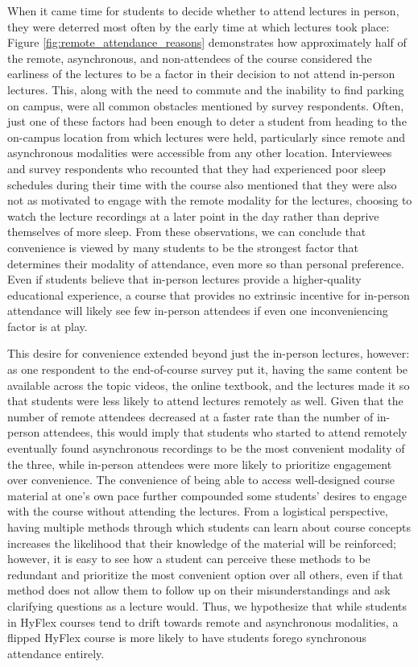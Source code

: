 When it came time for students to decide whether to attend lectures in person, they were deterred most often by the early time at which lectures took place: Figure \ref{fig:remote_attendance_reasons} demonstrates how approximately half of the remote, asynchronous, and non-attendees of the course considered the earliness of the lectures to be a factor in their decision to not attend in-person lectures. This, along with the need to commute and the inability to find parking on campus, were all common obstacles mentioned by survey respondents. Often, just one of these factors had been enough to deter a student from heading to the on-campus location from which lectures were held, particularly since remote and asynchronous modalities were accessible from any other location. Interviewees and survey respondents who recounted that they had experienced poor sleep schedules during their time with the course also mentioned that they were also not as motivated to engage with the remote modality for the lectures, choosing to watch the lecture recordings at a later point in the day rather than deprive themselves of more sleep. From these observations, we can conclude that convenience is viewed by many students to be the strongest factor that determines their modality of attendance, even more so than personal preference. Even if students believe that in-person lectures provide a higher-quality educational experience, a course that provides no extrinsic incentive for in-person attendance will likely see few in-person attendees if even one inconveniencing factor is at play.

This desire for convenience extended beyond just the in-person lectures, however: as one respondent to the end-of-course survey put it, having the same content be available across the topic videos, the online textbook, and the lectures made it so that students were less likely to attend lectures remotely as well. Given that the number of remote attendees decreased at a faster rate than the number of in-person attendees, this would imply that students who started to attend remotely eventually found asynchronous recordings to be the most convenient modality of the three, while in-person attendees were more likely to prioritize engagement over convenience. The convenience of being able to access well-designed course material at one's own pace further compounded some students' desires to engage with the course without attending the lectures. From a logistical perspective, having multiple methods through which students can learn about course concepts increases the likelihood that their knowledge of the material will be reinforced; however, it is easy to see how a student can perceive these methods to be redundant and prioritize the most convenient option over all others, even if that method does not allow them to follow up on their misunderstandings and ask clarifying questions as a lecture would. Thus, we hypothesize that while students in HyFlex courses tend to drift towards remote and asynchronous modalities, a flipped HyFlex course is more likely to have students forego synchronous attendance entirely.

